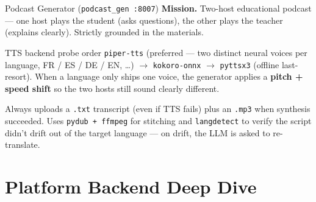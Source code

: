 \documentclass[aspectratio=169, 10pt]{beamer}
\begin{document}
\begin{frame}{Podcast Generator (\texttt{podcast\_gen :8007})}
  \scriptsize
  \textbf{Mission.} Two-host educational podcast --- one host plays the
  student (asks questions), the other plays the teacher (explains
  clearly). Strictly grounded in the materials.

  \centering

  \vspace{0.1cm}
  \begin{block}{TTS backend probe order}
    \scriptsize
    \texttt{piper-tts} (preferred --- two distinct neural voices per
    language, FR / ES / DE / EN, \dots) $\to$ \texttt{kokoro-onnx} $\to$
    \texttt{pyttsx3} (offline last-resort). When a language only ships
    one voice, the generator applies a \textbf{pitch + speed shift} so
    the two hosts still sound clearly different.
  \end{block}

  \scriptsize
  Always uploads a \texttt{.txt} transcript (even if TTS fails) plus an
  \texttt{.mp3} when synthesis succeeded. Uses \texttt{pydub + ffmpeg}
  for stitching and \texttt{langdetect} to verify the script didn't
  drift out of the target language --- on drift, the LLM is asked to
  re-translate.
\end{frame}

\section{Platform Backend Deep Dive}
\end{document}
